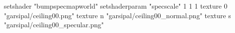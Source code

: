 setshader "bumpspecmapworld"
setshaderparam "specscale" 1 1 1
   texture 0 "garsipal/ceiling00.png"
   texture n "garsipal/ceiling00_normal.png"
   texture s "garsipal/ceiling00_specular.png"
